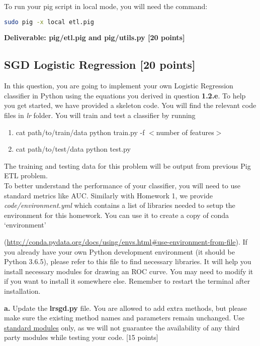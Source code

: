 \documentclass[12pt]{article}
\begin{document}
To run your pig script in local mode, you will need the command:  
\begin{lstlisting}[frame=single,language=bash]
sudo pig -x local etl.pig
\end{lstlisting}

\textbf{Deliverable: pig/etl.pig and pig/utils.py [20 points]}

\subsection{SGD Logistic Regression [20 points]}
In this question, you are going to implement your own Logistic Regression classifier in Python using the equations you derived in question \textbf{1.2.e}. To help you get started, we have provided a skeleton code. You will find the relevant code files in \textit{lr} folder. You will train and test a classifier by running 
\begin{enumerate}
\item cat path/to/train/data \textbar{} python train.py -f $<$number of features$>$
\item cat path/to/test/data \textbar{} python test.py 
\end{enumerate}
The training and testing data for this problem will be output from previous Pig ETL problem. \\

To better understand the performance of your classifier, you will need to use standard metrics like AUC. Similarly with Homework 1, we provide \textit{code/environment.yml} which contains a list of libraries needed to setup the environment for this homework. You can use it to create a copy of conda `environment' 

(\href{http://conda.pydata.org/docs/using/envs.html#use-environment-from-file}{http://conda.pydata.org/docs/using/envs.html\#use-environment-from-file}). If you already have your own Python development environment (it should be Python 3.6.5), please refer to this file to find necessary libraries. It will help you install necessary modules for drawing an ROC curve. You may need to modify it if you want to install it somewhere else. Remember to restart the terminal after installation.

\textbf{a.} Update the \textbf{lrsgd.py} file. You are allowed to add extra methods, but please make sure the existing method names and parameters remain unchanged. Use \href{https://docs.python.org/3/library/}{standard modules} only, as we will not guarantee the availability of any third party modules while testing your code. [15 points]
\end{document}
